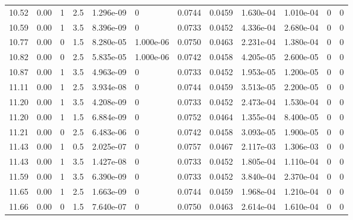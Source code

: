 \documentclass[preview]{standalone}
\begin{document}
{{{{\begin{tabular}{L{1.2cm}C{1.2cm} C{0.3cm}C{0.5cm} C{1.4cm}C{1.4cm} C{1.4cm}C{1.4cm} C{1.6cm}C{1.6cm} C{1.6cm}C{1.6cm}}
  10.52  &  0.00  & 1     & 2.5 &  1.296e-09  & 0  &  0.0744&   0.0459& 1.630e-04 & 1.010e-04   &  0 & 0  \\ 
  10.59  &  0.00  & 1     & 3.5 &  8.396e-09  & 0  &  0.0733&   0.0452& 4.336e-04 & 2.680e-04   &  0 & 0  \\ 
  10.77  &  0.00  & 0     & 1.5 &  8.280e-05  & 1.000e-06  &  0.0750&   0.0463& 2.231e-04 & 1.380e-04   &  0 & 0  \\ 
  10.82  &  0.00  & 0     & 2.5 &  5.835e-05  & 1.000e-06  &  0.0742&   0.0458& 4.205e-05 & 2.600e-05   &  0 & 0  \\ 
  10.87  &  0.00  & 1     & 3.5 &  4.963e-09  & 0  &  0.0733&   0.0452& 1.953e-05 & 1.200e-05   &  0 & 0  \\ 
  11.11  &  0.00  & 1     & 2.5 &  3.934e-08  & 0  &  0.0744&   0.0459& 3.513e-05 & 2.200e-05   &  0 & 0  \\ 
  11.20  &  0.00  & 1     & 3.5 &  4.208e-09  & 0  &  0.0733&   0.0452& 2.473e-04 & 1.530e-04   &  0 & 0  \\ 
  11.20  &  0.00  & 1     & 1.5 &  6.884e-09  & 0  &  0.0752&   0.0464& 1.355e-04 & 8.400e-05   &  0 & 0  \\ 
  11.21  &  0.00  & 0     & 2.5 &  6.483e-06  & 0  &  0.0742&   0.0458& 3.093e-05 & 1.900e-05   &  0 & 0  \\ 
  11.43  &  0.00  & 1     & 0.5 &  2.025e-07  & 0  &  0.0757&   0.0467& 2.117e-03 & 1.306e-03   &  0 & 0  \\ 
  11.43  &  0.00  & 1     & 3.5 &  1.427e-08  & 0  &  0.0733&   0.0452& 1.805e-04 & 1.110e-04   &  0 & 0  \\ 
  11.59  &  0.00  & 1     & 3.5 &  6.390e-09  & 0  &  0.0733&   0.0452& 3.840e-04 & 2.370e-04   &  0 & 0  \\ 
  11.65  &  0.00  & 1     & 2.5 &  1.663e-09  & 0  &  0.0744&   0.0459& 1.968e-04 & 1.210e-04   &  0 & 0  \\ 
  11.66  &  0.00  & 0     & 1.5 &  7.640e-07  & 0  &  0.0750&   0.0463& 2.614e-04 & 1.610e-04   &  0 & 0  \\ 
\hline 
\end{tabular} 

}}}}
\end{document}
